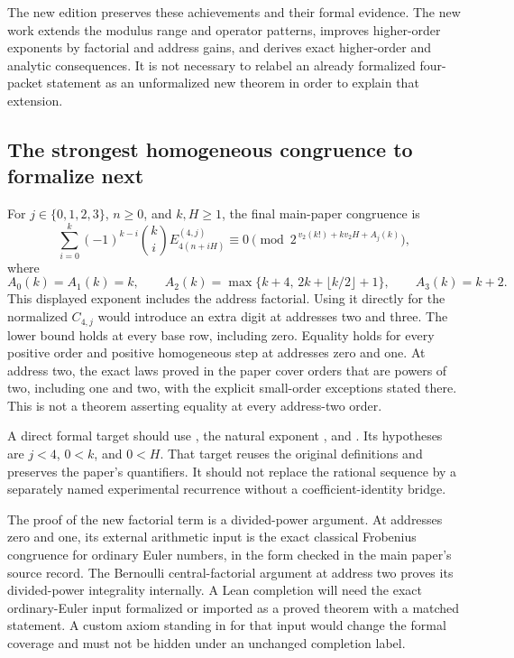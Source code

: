 The new edition preserves these achievements and their formal evidence. The new work extends the modulus range and operator patterns, improves higher-order exponents by factorial and address gains, and derives exact higher-order and analytic consequences. It is not necessary to relabel an already formalized four-packet statement as an unformalized new theorem in order to explain that extension.

\subsection{The strongest homogeneous congruence to formalize next}
For $j\in\{0,1,2,3\}$, $n\ge0$, and $k,H\ge1$, the final main-paper congruence is
\[
 \sum_{i=0}^k(-1)^{k-i}\binom{k}{i}
 E_{4(n+iH)}^{(4,j)}\equiv0
 \pmod{2^{\,v_2(k!)+k v_2H+A_j(k)}},
\]
where
\[
 A_0(k)=A_1(k)=k,\qquad
 A_2(k)=\max\{k+4,\,2k+\lfloor k/2\rfloor+1\},\qquad
 A_3(k)=k+2.
\]
This displayed exponent includes the address factorial. Using it directly for the normalized $C_{4,j}$ would introduce an extra digit at addresses two and three. The lower bound holds at every base row, including zero. Equality holds for every positive order and positive homogeneous step at addresses zero and one. At address two, the exact laws proved in the paper cover orders that are powers of two, including one and two, with the explicit small-order exceptions stated there. This is not a theorem asserting equality at every address-two order.

A direct formal target should use , the natural exponent , and . Its hypotheses are $j<4$, $0<k$, and $0<H$. That target reuses the original definitions and preserves the paper's quantifiers. It should not replace the rational sequence by a separately named experimental recurrence without a coefficient-identity bridge.

The proof of the new factorial term is a divided-power argument. At addresses zero and one, its external arithmetic input is the exact classical Frobenius congruence for ordinary Euler numbers, in the form checked in the main paper's source record. The Bernoulli central-factorial argument at address two proves its divided-power integrality internally. A Lean completion will need the exact ordinary-Euler input formalized or imported as a proved theorem with a matched statement. A custom axiom standing in for that input would change the formal coverage and must not be hidden under an unchanged completion label.

